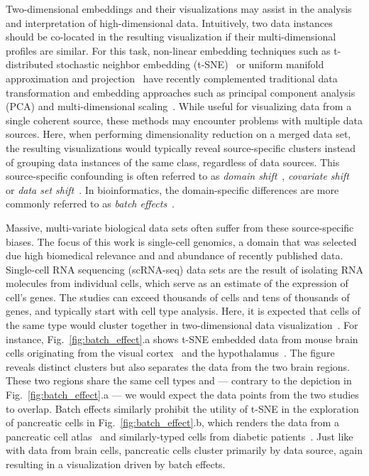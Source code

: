 \documentclass[runningheads]{llncs}
\begin{document}
Two-dimensional embeddings and their visualizations may assist in the analysis
and interpretation of high-dimensional data. Intuitively, two data instances
should be co-located in the resulting visualization if their multi-dimensional
profiles are similar. For this task, non-linear embedding techniques such as
t\nobreakdash -distributed stochastic neighbor embedding (t-SNE)~\cite{tsne} or
uniform manifold approximation and projection~\cite{umap} have recently
complemented traditional data transformation and embedding approaches such as
principal component analysis (PCA) and multi-dimensional
scaling~\cite{distill,umap_single_cell}. While useful for visualizing data from
a single coherent source, these methods may encounter problems with multiple
data sources. Here, when performing dimensionality reduction on a merged data
set, the resulting visualizations would typically reveal source-specific
clusters instead of grouping data instances of the same class, regardless of
data sources. This source-specific confounding is often referred to as {\em
domain shift}~\cite{domain_shift}, {\em covariate shift}~\cite{covariate_shift}
or {\em data set shift}~\cite{dataset_shift}. In bioinformatics, the
domain-specific differences are more commonly referred to as {\em batch
effects}~\cite{cca,mnn,seurat}.

Massive, multi-variate biological data sets often suffer from these
source-specific biases.  The focus of this work is single-cell genomics, a
domain that was selected due high biomedical relevance and and abundance of
recently published data. Single-cell RNA sequencing (scRNA-seq) data sets are
the result of isolating RNA molecules from individual cells, which serve as an
estimate of the expression of cell's genes.  The studies can exceed thousands
of cells and tens of thousands of genes, and typically start with cell type
analysis. Here, it is expected that cells of the same type would cluster
together in two-dimensional data visualization~\cite{seurat}. For instance,
Fig.~\ref{fig:batch_effect}.a shows t-SNE embedded data from mouse brain cells
originating from the visual cortex~\cite{hrvatin2018} and the
hypothalamus~\cite{chen2017}. The figure reveals distinct clusters but also
separates the data from the two brain regions. These two regions share the same
cell types and --- contrary to the depiction in Fig.~\ref{fig:batch_effect}.a
--- we would expect the data points from the two studies to overlap. Batch
effects similarly prohibit the utility of t-SNE in the exploration of
pancreatic cells in Fig.~\ref{fig:batch_effect}.b, which renders the data from
a pancreatic cell atlas~\cite{baron2016} and similarly-typed cells from
diabetic patients~\cite{xin2016}. Just like with data from brain cells,
pancreatic cells cluster primarily by data source, again resulting in a
visualization driven by batch effects.
\end{document}
